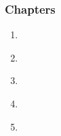 \begin{frame}[fragile,label=outline] 
\frametitle{Chapters}
\begin{center}
\begin{minipage}{3.25in}
\begin{enumerate}
\item  \hyperlink{s-intro<1>}      {\BUTTON {\orow{\textbf{\sIntro}}}} \\
\item  \hyperlink{s-project<1>}    {\BUTTON {\erow{\textbf{\sProject}}}} \\
\item  \hyperlink{s-present<1>}    {\BUTTON {\orow{\textbf{\sPresent}}}} \\
\item  \hyperlink{s-recent<1>}     {\BUTTON {\erow{\textbf{\sRecent}}}} \\
\item  \hyperlink{s-future<1>}     {\BUTTON {\orow{\textbf{\sFuture}}}} \\
\end{enumerate}
\end{minipage}
\end{center}
\end{frame}


\NEWMOD \section{\sIntro}

